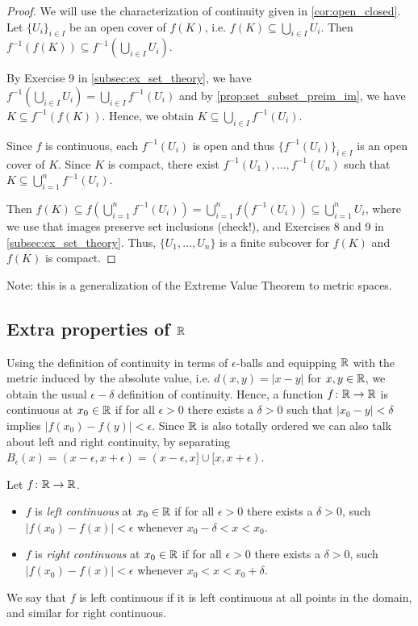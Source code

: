 \documentclass{article}
\begin{document}
\begin{proof}
We will use the characterization of continuity given in \cref{cor:open_closed}. Let $\{U_i\}_{i\in I}$ be an open cover of $f(K)$, i.e. $f(K) \subseteq \bigcup_{i\in I} U_i$. Then $f^{-1}(f(K)) \subseteq f^{-1}(\bigcup_{i\in I} U_i)$. 

By Exercise 9 in \cref{subsec:ex_set_theory}, we have $f^{-1}(\bigcup_{i\in I} U_i) = \bigcup_{i\in I}f^{-1} (U_i)$ and by \cref{prop:set_subset_preim_im}, we have $K\subseteq f^{-1}(f(K))$. Hence, we obtain $K \subseteq \bigcup_{i\in I}f^{-1} (U_i)$. 

Since $f$ is continuous, each $f^{-1} (U_i)$ is open and thus $\{f^{-1} (U_i)\}_{i\in I}$ is an open cover of $K$. Since $K$ is compact, there exist $f^{-1}(U_1),\ldots, f^{-1}(U_n)$ such that $K \subseteq \bigcup_{i=1}^n f^{-1}(U_i)$. 

Then $f(K) \subseteq f(\bigcup_{i=1}^n f^{-1}(U_i)) = \bigcup_{i=1}^n f(f^{-1}(U_i)) \subseteq \bigcup_{i=1}^n U_i$, where we use that images preserve set inclusions (check!), and Exercises 8 and 9 in \cref{subsec:ex_set_theory}. Thus, $\{U_1,\ldots, U_n\}$ is a finite subcover for $f(K)$ and $f(K)$ is compact. 
\end{proof}

Note: this is a generalization of the Extreme Value Theorem to metric spaces.

\subsection{Extra properties of \texorpdfstring{${\mathbb{R}}$}{R}}

Using the definition of continuity in terms of $\epsilon$-balls and equipping ${\mathbb{R}}$ with the metric induced by the absolute value, i.e. $d(x,y) = \vert x- y\vert$ for $x,y\in {\mathbb{R}}$, we obtain the usual $\epsilon-\delta$ definition of continuity. Hence, a function $f\colon {\mathbb{R}} \to {\mathbb{R}}$ is continuous at $x_0\in {\mathbb{R}}$ if for all $\epsilon>0$ there exists a $\delta>0$ such that $\vert x_0-y\vert <\delta$ implies $\vert f(x_0)-f(y)\vert<\epsilon$. Since ${\mathbb{R}}$ is also totally ordered we can also talk about left and right continuity, by separating $B_\epsilon(x) = (x-\epsilon, x+ \epsilon) = (x-\epsilon, x] \cup [x, x+\epsilon)$.

\begin{definition} Let $f\colon {\mathbb{R}} \to {\mathbb{R}}$.
\begin{itemize}
    \item $f$ is \emph{left continuous} at $x_0\in {\mathbb{R}}$ if for all $\epsilon >0$ there exists a $\delta>0$, such $\vert f(x_0)-f(x)\vert<\epsilon$ whenever $ x_0-\delta <x<x_0$.
    \item $f$ is \emph{right continuous} at $x_0\in {\mathbb{R}}$ if for all $\epsilon >0$ there exists a $\delta>0$, such $\vert f(x_0)-f(x)\vert<\epsilon$ whenever $x_0<x<x_0+\delta$.
\end{itemize}
We say that $f$ is left continuous if it is left continuous at all points in the domain, and similar for right continuous.
\end{definition}
\end{document}
